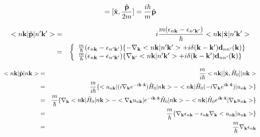 \documentclass[aps,prb,preprint]{revtex4-1}
\begin{document}
\begin{appendix}
\begin{eqnarray}
[\hat{\bf x}, \hat{H}_0] = [\hat{\bf x}, \frac{\hat{\bf p}}{2m}]  =\frac{i \hbar}{m}\hat{\bf p}
\end{eqnarray} 

\begin{eqnarray}
<n{\bf k}|\hat{\bf p}|n'{\bf k'}> &=&i \frac{m(\epsilon_{n{\bf k}}-\epsilon_{n'{\bf k'}})}{\hbar} <n{\bf k}|\hat{\bf x}|n'{\bf k'}> \nonumber \\
&=&\left\{
\begin{array}{l}
\frac{m}{\hbar}(\epsilon_{n{\bf k}}-\epsilon_{n'{\bf k'}})\{-\nabla_{\bf k} <n{\bf k}|n'{\bf k'}> + i \delta({\bf k-k'}) {\bf d}_{nn'}({\bf k})\}  \\
\frac{m}{\hbar}(\epsilon_{n{\bf k}}-\epsilon_{n'{\bf k'}})\{\nabla_{\bf k'} <n{\bf k}|n'{\bf k'}> + i \delta({\bf k-k'}) {\bf d}_{nn'}({\bf k})\} 
\end{array}
\right.
\end{eqnarray} 

\begin{eqnarray}
<n{\bf k}|\hat{\bf p}|n{\bf k}> &=& \frac{m}{i \hbar} <n{\bf k}|[\hat{\bf x},\hat{H}_0]|n{\bf k}> \nonumber \\
&=& \frac{m}{i \hbar} \{ <u_{n{\bf k}}| (i \nabla_{\bf k} e^{-i{\bf k \cdot \hat{x} }} ) \hat{H}_0 |n{\bf k}> - <n{\bf k}| \hat{H}_0 (-i\nabla_{\bf k} e^{i{\bf k \cdot \hat{x}} }) |u_{n{\bf k}}> \} \nonumber \\
&=& \frac{m}{\hbar} \{  \nabla_{\bf k} <n{\bf k}|\hat{H}_0|n{\bf k}> - <\nabla_{\bf k} u_{n{\bf k}}| e^{-i{\bf k \cdot \hat{x}} } \hat{H}_0  |n{\bf k}> - <n{\bf k}| \hat{H}_0 e^{i{\bf k \cdot \hat{x}} }|\nabla_{\bf k} u_{n{\bf k}}> \} \nonumber \\
&=& \frac{m}{\hbar} \{  \nabla_{\bf k} \epsilon_{n{\bf k}} -  \epsilon_{n{\bf k}} \nabla_{\bf k} <u_{n{\bf k}}| u_{n{\bf k}}>\}  \nonumber \\
&=& \frac{m}{\hbar} \nabla_{\bf k} \epsilon_{n{\bf k}}
\end{eqnarray} 



\end{appendix}
\end{document}
